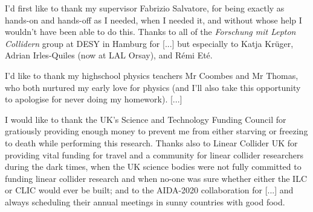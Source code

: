 
I'd first like to thank my supervisor Fabrizio Salvatore, for being exactly as hands-on and hands-off as I needed, when I needed it, and without whose help I wouldn't have been able to do this. Thanks to all of the \emph{Forschung mit Lepton Collidern} group at DESY in Hamburg for [...] but especially to Katja Kr\"{u}ger, Adrian Irles-Quiles (now at LAL Orsay), and R\'{e}mi Et\'{e}.

I'd like to thank my highschool physics teachers Mr Coombes and Mr Thomas, who both nurtured my early love for physics (and I'll also take this opportunity to apologise for never doing my homework). [...] 

I would like to thank the UK's Science and Technology Funding Council for gratiously providing enough money to prevent me from either starving or freezing to death while performing this research. Thanks also to Linear Collider UK for providing vital funding for travel and a community for linear collider researchers during the dark times, when the UK science bodies were not fully committed to funding linear collider research and when no-one was sure whether either the ILC or CLIC would ever be built; and to the AIDA-2020 collaboration for [...] and always scheduling their annual meetings in sunny countries with good food.